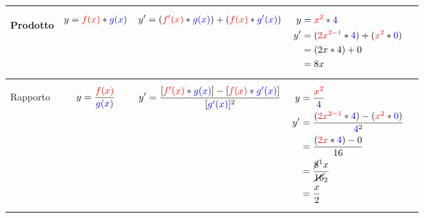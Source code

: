 \documentclass[../../main]{subfiles}
\begin{document}
\begin{center}
{\begin{tabular}{ |p{5em} | p{5em} | p{5em} | p{7em} | p{2cm}| }
            \hline
            
            \begin{center}
                Prodotto
            \end{center} &
            \begin{align}
                y= {\color{red}f(x)} * {\color{blue}g(x)} \nonumber
            \end{align}  &
            \begin{align}
                y'= ({\color{red}f'(x)} * {\color{blue}g(x)} ) + ( {\color{red}f(x)} * {\color{blue}g'(x)}) \nonumber
            \end{align} &
            {
                \begin{align}
                    y  &= {\color{red}x^2} * {\color{blue}4}   \nonumber \\
                    y' &= ( {\color{red}2x^{2-1}} * {\color{blue}4} ) + ( {\color{red}x^2} * {\color{blue}0} ) \nonumber \\
                        &= (2x * 4) + 0 \nonumber \\
                        &= 8x \nonumber 
                \end{align}
            } &
            \begin{center}
            \end{center} \\ 

            \hline
            
            \begin{center}
                Rapporto
            \end{center} &
            \begin{align}
                y= \frac{\color{red}f(x)}{\color{blue}g(x)} \nonumber
            \end{align}  &
            \begin{align}
                y'= \frac{[{\color{red}f'(x)} * {\color{blue}g(x)} ] - [ {\color{red}f(x)} * {\color{blue}g'(x)}]}{[{\color{blue}g'(x)}]^2} \nonumber
            \end{align} &
            {
                \begin{align}
                    y  &= \frac{\color{red}x^2}{\color{blue}4}   \nonumber \\
                    y' &= \frac{( {\color{red}2x^{2-1}} * {\color{blue}4} ) - ( {\color{red}x^2} * {\color{blue}0} )}{{\color{blue}4}^2} \nonumber \\
                        &= \frac{({\color{red}2x} * {\color{blue}4}) - 0}{16} \nonumber \\
                        &= \frac{\cancel{8}^1x}{\cancel{16}_2} \nonumber  \\
                        &= \frac{x}{2} \nonumber
                \end{align}
            } &
            \begin{center}
            \end{center} \\ 


\end{tabular}}
\end{center}
\end{document}

